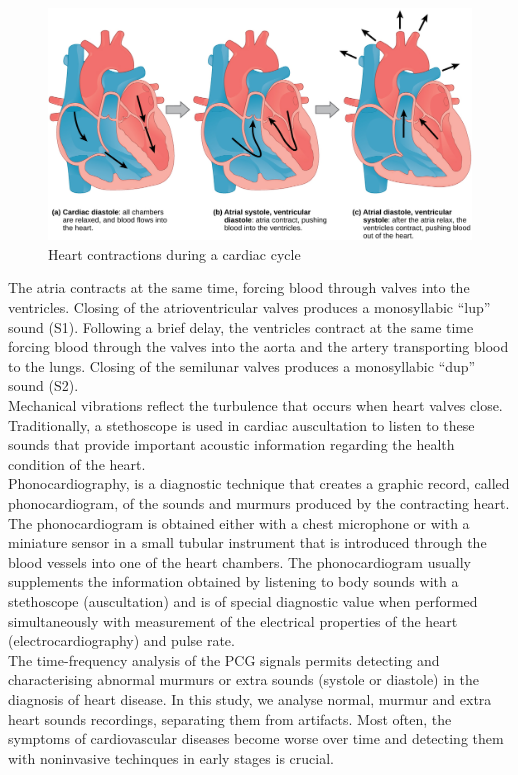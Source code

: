 \documentclass[11pt, a4papper]{report}
\theoremstyle{plain}
\theoremstyle{definition}
\theoremstyle{definition}
\theoremstyle{proposition}
\begin{document}
\begin{figure}[h]
\includegraphics[width=14cm]{heart.jpg}
\centering
\caption{Heart contractions during a cardiac cycle}
\end{figure}


The atria contracts at the same time, forcing blood through valves into the ventricles. Closing of the atrioventricular valves produces a monosyllabic “lup” sound (S1). Following a brief delay, the ventricles contract at the same time forcing blood through the valves into the aorta and the artery transporting blood to the lungs. Closing of the semilunar valves produces a monosyllabic “dup” sound (S2).
\\

Mechanical vibrations reflect the turbulence that occurs when heart valves close. Traditionally, a stethoscope is used in cardiac auscultation to listen to these sounds that provide important acoustic information regarding the health condition of the heart. 
\\

Phonocardiography, is a diagnostic technique that creates a graphic record, called phonocardiogram, of the sounds and murmurs produced by the contracting heart. The phonocardiogram is obtained either with a chest microphone or with a miniature sensor in a small tubular instrument that is introduced through the blood vessels into one of the heart chambers. The phonocardiogram usually supplements the information obtained by listening to body sounds with a stethoscope (auscultation) and is of special diagnostic value when performed simultaneously with measurement of the electrical properties of the heart (electrocardiography) and pulse rate.
\\

The time-frequency analysis of the PCG signals permits detecting and characterising abnormal murmurs or extra sounds (systole or diastole) in the diagnosis of heart disease. In this study, we analyse normal, murmur and extra heart sounds recordings, separating them from artifacts. Most often, the symptoms of cardiovascular diseases become worse over time and detecting them with noninvasive techinques in early stages is crucial.
\\
\end{document}
